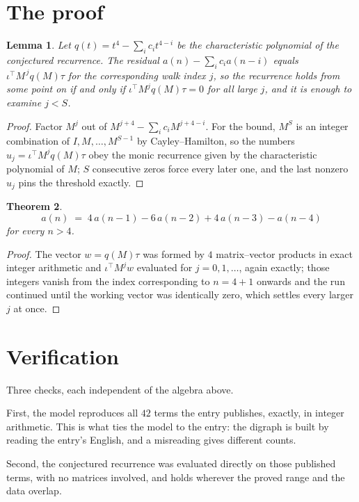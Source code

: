 \documentclass[11pt,a4paper]{article}
\theoremstyle{plain}
\newtheorem{theorem}{Theorem}
\newtheorem{lemma}[theorem]{Lemma}
\theoremstyle{definition}
\begin{document}
\section{The proof}

\begin{lemma}\label{lem:crit}
Let $q(t)=t^{4}-\sum_i c_it^{4-i}$ be the characteristic polynomial of the
conjectured recurrence. The residual $a(n)-\sum_ic_ia(n-i)$ equals
$\iota^{\!\top}M^{\,j}q(M)\tau$ for the corresponding walk index $j$, so the recurrence
holds from some point on if and only if $\iota^{\!\top}M^{j}q(M)\tau=0$ for all large $j$,
and it is enough to examine $j<S$.
\end{lemma}

\begin{proof}
Factor $M^{j}$ out of $M^{j+4}-\sum_ic_iM^{j+4-i}$. For the bound, $M^{S}$
is an integer combination of $I,M,\dots,M^{S-1}$ by Cayley--Hamilton, so the numbers
$u_j=\iota^{\!\top}M^{j}q(M)\tau$ obey the monic recurrence given by the characteristic
polynomial of $M$; $S$ consecutive zeros force every later one, and the last nonzero $u_j$
pins the threshold exactly.
\end{proof}

\begin{theorem}
\[
a(n)\;=\;4\,a(n-1) - 6\,a(n-2) + 4\,a(n-3) - a(n-4)
\]
for every $n>4$.
\end{theorem}

\begin{proof}
The vector $w=q(M)\tau$ was formed by $4$ matrix--vector products in exact integer
arithmetic and $\iota^{\!\top}M^{j}w$ evaluated for $j=0,1,\dots$, again exactly; those
integers vanish from the index corresponding to $n=4+1$ onwards and the run continued
until the working vector was identically zero, which settles every larger $j$ at once.
\end{proof}

\section{Verification}

Three checks, each independent of the algebra above.

First, the model reproduces all $42$ terms the entry publishes, exactly, in integer
arithmetic. This is what ties the model to the entry: the digraph is built by reading the
entry's English, and a misreading gives different counts.

Second, the conjectured recurrence was evaluated directly on those published terms, with no
matrices involved, and holds wherever the proved range and the data overlap.
\end{document}
